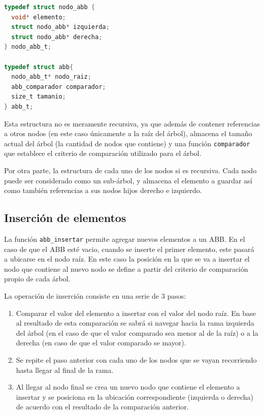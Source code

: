 \documentclass[titlepage,a4paper]{article}
\begin{document}
\begin{lstlisting}[language=C]
typedef struct nodo_abb {
  void* elemento;
  struct nodo_abb* izquierda;
  struct nodo_abb* derecha;
} nodo_abb_t;

typedef struct abb{
  nodo_abb_t* nodo_raiz;
  abb_comparador comparador;
  size_t tamanio;
} abb_t;
\end{lstlisting}

Esta estructura no es meramente recursiva, ya que además de contener
referencias a otros nodos (en este caso únicamente a la raíz del árbol),
almacena el tamaño actual del árbol (la cantidad de nodos que contiene) y una
función \lstinline{comparador} que establece el criterio de comparación
utilizado para el árbol.

Por otra parte, la estructura de cada uno de los nodos si es recursiva. Cada
nodo puede ser considerado como un sub-árbol, y almacena el elemento a guardar
así como también referencias a sus nodos hijos derecho e izquierdo.


											\subsection{Inserción de elementos}

La función \lstinline{abb_insertar} permite agregar nuevos elementos a un ABB.
En el caso de que el ABB esté vacio, cuando se inserte el primer elemento, este
pasará a ubicarse en el nodo raíz. En este caso la posición en la que se va a
insertar el nodo que contiene al nuevo nodo se define a partir del criterio de
comparación propio de cada árbol. 

La operación de inserción consiste en una serie de 3 pasos:

\begin{enumerate}
	\item Comparar el valor del elemento a insertar con el valor del nodo raíz.
		En base al resultado de esta comparación se sabrá si navegar hacia la rama
		izquierda del árbol (en el caso de que el valor comparado sea menor al de
		la raíz) o a la derecha (en caso de que el valor comparado se mayor).
	\item Se repite el paso anterior con cada uno de los nodos que se vayan 
		recorriendo hasta llegar al final de la rama.
	\item Al llegar al nodo final se crea un nuevo nodo que contiene el elemento
		a insertar y se posiciona en la ubicación correspondiente (izquierda o
		derecha) de acuerdo con el resultado de la comparación anterior.
\end{enumerate}
\end{document}
